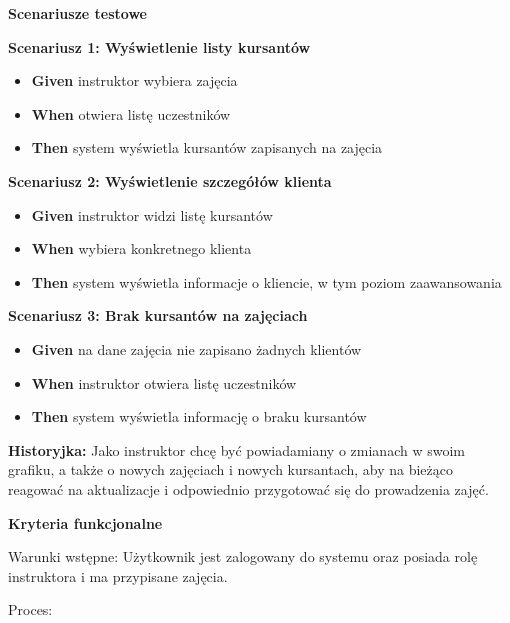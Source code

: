 \documentclass[a4paper,12pt]{article}
\begin{document}
\noindent \textbf{Scenariusze testowe}

\textbf{Scenariusz 1: Wyświetlenie listy kursantów}
\begin{itemize}
    \item \textbf{Given} instruktor wybiera zajęcia
    \item \textbf{When} otwiera listę uczestników
    \item \textbf{Then} system wyświetla kursantów zapisanych na zajęcia
\end{itemize}

\textbf{Scenariusz 2: Wyświetlenie szczegółów klienta}
\begin{itemize}
    \item \textbf{Given} instruktor widzi listę kursantów
    \item \textbf{When} wybiera konkretnego klienta
    \item \textbf{Then} system wyświetla informacje o kliencie, w tym poziom zaawansowania
\end{itemize}

\textbf{Scenariusz 3: Brak kursantów na zajęciach}
\begin{itemize}
    \item \textbf{Given} na dane zajęcia nie zapisano żadnych klientów
    \item \textbf{When} instruktor otwiera listę uczestników
    \item \textbf{Then} system wyświetla informację o braku kursantów
\end{itemize}

\vspace{0,5cm}

\noindent \textbf{Historyjka:} Jako instruktor chcę być powiadamiany o zmianach w swoim grafiku, a także o nowych zajęciach i nowych kursantach, aby na bieżąco reagować na aktualizacje i odpowiednio przygotować się do prowadzenia zajęć.

\vspace{0,2cm}

\noindent \textbf{Kryteria funkcjonalne}

\vspace{0,2cm}

\noindent Warunki wstępne: Użytkownik jest zalogowany do systemu oraz posiada rolę instruktora i ma przypisane zajęcia.

\vspace{0,2cm}

\noindent Proces:
\end{document}
